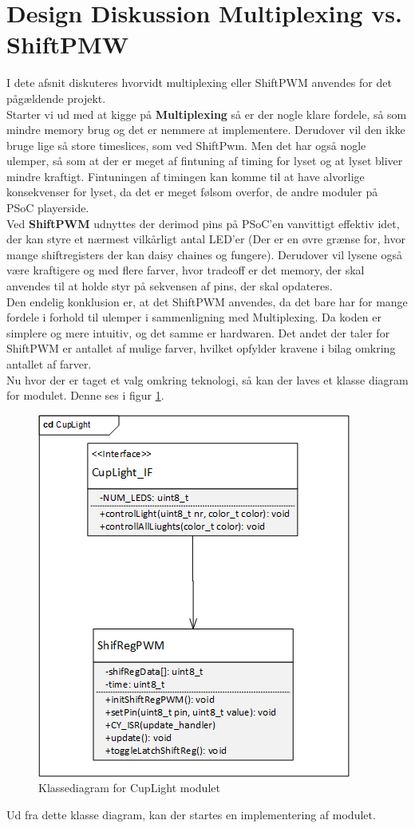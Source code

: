 \documentclass[Softwaredesign/Softwaredesign_main.tex]{subfiles}
\begin{document}
\section{Design Diskussion Multiplexing vs. ShiftPMW}
I dete afsnit diskuteres hvorvidt multiplexing eller ShiftPWM anvendes for det pågældende projekt.\\
Starter vi ud med at kigge på \textbf{Multiplexing} så er der nogle klare fordele, så som mindre memory brug og det er nemmere at implementere. Derudover vil den ikke bruge lige så store timeslices, som ved ShiftPwm. Men det har også nogle ulemper, så som at der er meget af fintuning af timing for lyset og at lyset bliver mindre kraftigt. Fintuningen af timingen kan komme til at have alvorlige konsekvenser for lyset, da det er meget følsom overfor, de andre moduler på PSoC playerside.
\\Ved \textbf{ShiftPWM} udnyttes der derimod pins på PSoC'en vanvittigt effektiv idet, der kan styre et nærmest vilkårligt antal LED'er (Der er en øvre grænse for, hvor mange shiftregisters der kan daisy chaines og fungere). Derudover vil lysene også være kraftigere og med flere farver, hvor tradeoff er det memory, der skal anvendes til at holde styr på sekvensen af pins, der skal opdateres.
\\Den endelig konklusion er, at det ShiftPWM anvendes, da det bare har for mange fordele i forhold til ulemper i sammenligning med Multiplexing. Da koden er simplere og mere intuitiv, og det samme er hardwaren. Det andet der taler for ShiftPWM er antallet af mulige farver, hvilket opfylder kravene i bilag  omkring antallet af farver.\\
Nu hvor der er taget et valg omkring teknologi, så kan der laves et klasse diagram for modulet. Denne ses i figur \ref{fig:cd_cuplight}.

\begin{figure}[H]
    \centering
    \includegraphics[width=\textwidth]{Softwaredesign/CupLight_IF/graphics/CD_CupLight.png}
    \caption{Klassediagram for CupLight modulet}
    \label{fig:cd_cuplight}
\end{figure}
Ud fra dette klasse diagram, kan der startes en implementering af modulet.
\end{document}
